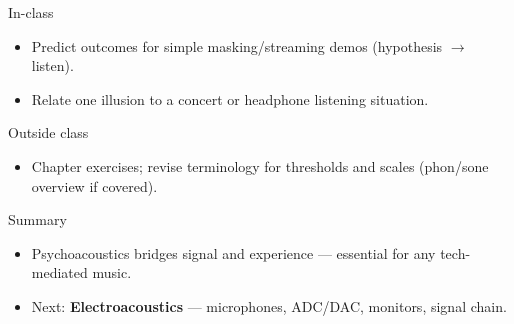 \documentclass[aspectratio=169]{beamer}
\begin{document}
\begin{frame}{In-class}
  \begin{itemize}
    \item Predict outcomes for simple masking/streaming demos (hypothesis $\rightarrow$ listen).
    \item Relate one illusion to a concert or headphone listening situation.
  \end{itemize}
\end{frame}

\begin{frame}{Outside class}
  \begin{itemize}
    \item Chapter exercises; revise terminology for thresholds and scales (phon/sone overview if covered).
  \end{itemize}
\end{frame}

\begin{frame}{Summary}
  \begin{itemize}
    \item Psychoacoustics bridges signal and experience — essential for any tech-mediated music.
    \item Next: \textbf{Electroacoustics} — microphones, ADC/DAC, monitors, signal chain.
  \end{itemize}
\end{frame}
\end{document}
